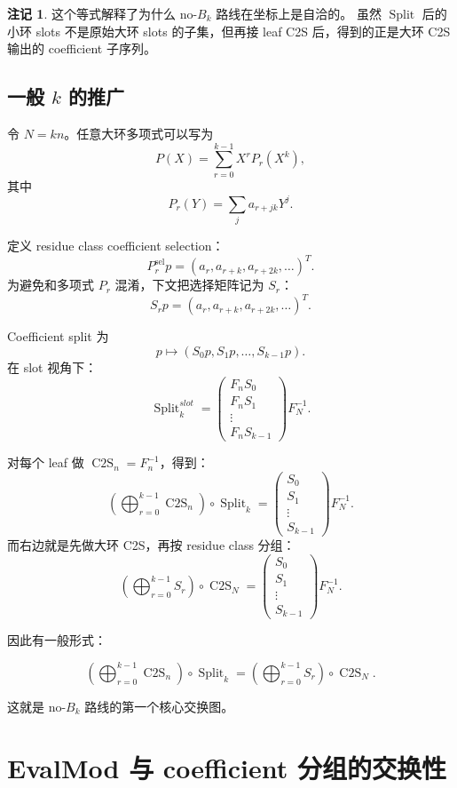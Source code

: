 \documentclass[UTF8,11pt]{ctexart}
\theoremstyle{definition}
\newtheorem{remark}{注记}
\newcommand{\CtwoS}{\operatorname{C2S}}
\newcommand{\Split}{\operatorname{Split}}
\begin{document}
\begin{remark}
这个等式解释了为什么 no-\(B_k\) 路线在坐标上是自洽的。
虽然 \(\Split\) 后的小环 slots 不是原始大环 slots 的子集，但再接 leaf C2S 后，得到的正是大环 C2S 输出的 coefficient 子序列。
\end{remark}

\subsection{一般 \(k\) 的推广}

令 \(N=kn\)。任意大环多项式可以写为
\[
P(X)=\sum_{r=0}^{k-1}X^rP_r(X^k),
\]
其中
\[
P_r(Y)=\sum_{j}a_{r+jk}Y^j.
\]

定义 residue class coefficient selection：
\[
P_r^{\mathrm{sel}}p
=
(a_r,a_{r+k},a_{r+2k},\ldots)^T.
\]
为避免和多项式 \(P_r\) 混淆，下文把选择矩阵记为 \(S_r\)：
\[
S_rp=(a_r,a_{r+k},a_{r+2k},\ldots)^T.
\]

Coefficient split 为
\[
p\longmapsto (S_0p,S_1p,\ldots,S_{k-1}p).
\]
在 slot 视角下：
\[
\Split_k^{slot}
=
\begin{pmatrix}
F_nS_0\\
F_nS_1\\
\vdots\\
F_nS_{k-1}
\end{pmatrix}
F_N^{-1}.
\]

对每个 leaf 做 \(\CtwoS_n=F_n^{-1}\)，得到：
\[
\left(\bigoplus_{r=0}^{k-1}\CtwoS_n\right)\circ\Split_k
=
\begin{pmatrix}
S_0\\
S_1\\
\vdots\\
S_{k-1}
\end{pmatrix}
F_N^{-1}.
\]
而右边就是先做大环 C2S，再按 residue class 分组：
\[
\left(\bigoplus_{r=0}^{k-1}S_r\right)\circ\CtwoS_N
=
\begin{pmatrix}
S_0\\
S_1\\
\vdots\\
S_{k-1}
\end{pmatrix}
F_N^{-1}.
\]

因此有一般形式：

\[
\boxed{
\left(\bigoplus_{r=0}^{k-1}\CtwoS_n\right)\circ\Split_k
=
\left(\bigoplus_{r=0}^{k-1}S_r\right)\circ\CtwoS_N.
}
\]

这就是 no-\(B_k\) 路线的第一个核心交换图。

\section{EvalMod 与 coefficient 分组的交换性}
\end{document}
